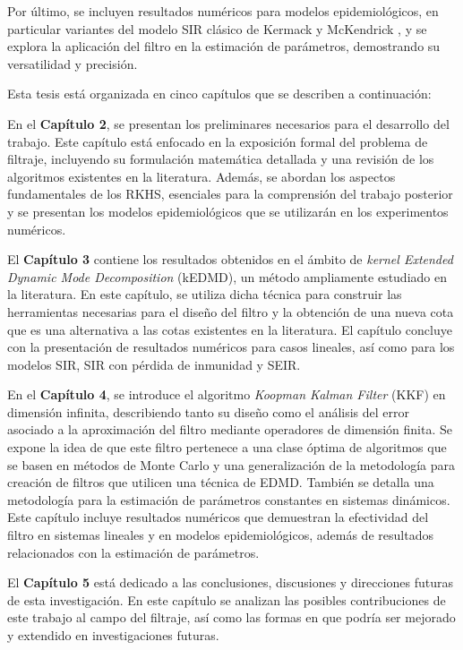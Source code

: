 Por último, se incluyen resultados numéricos para modelos epidemiológicos, en particular variantes del modelo SIR clásico de Kermack y McKendrick \cite{Hethcote1989ThreeModels, Grassly2008MathematicalTransmission}, y se explora la aplicación del filtro en la estimación de parámetros, demostrando su versatilidad y precisión.

Esta tesis está organizada en cinco capítulos que se describen a continuación:

En el \textbf{Capítulo 2}, se presentan los preliminares necesarios para el desarrollo del trabajo. Este capítulo está enfocado en la exposición formal del problema de filtraje, incluyendo su formulación matemática detallada y una revisión de los algoritmos existentes en la literatura. Además, se abordan los aspectos fundamentales de los RKHS, esenciales para la comprensión del trabajo posterior y se presentan los modelos epidemiológicos que se utilizarán en los experimentos numéricos.

El \textbf{Capítulo 3} contiene los resultados obtenidos en el ámbito de \textit{kernel Extended Dynamic Mode Decomposition} (kEDMD), un método ampliamente estudiado en la literatura. En este capítulo, se utiliza dicha técnica para construir las herramientas necesarias para el diseño del filtro y la obtención de una nueva cota que es una alternativa a las cotas existentes en la literatura. El capítulo concluye con la presentación de resultados numéricos para casos lineales, así como para los modelos SIR, SIR con pérdida de inmunidad y SEIR.

En el \textbf{Capítulo 4}, se introduce el algoritmo \textit{Koopman Kalman Filter} (KKF) en dimensión infinita, describiendo tanto su diseño como el análisis del error asociado a la aproximación del filtro mediante operadores de dimensión finita. Se expone la idea de que este filtro pertenece a una clase óptima de algoritmos que se basen en métodos de Monte Carlo y una generalización de la metodología para creación de filtros que utilicen una técnica de EDMD. También se detalla una metodología para la estimación de parámetros constantes en sistemas dinámicos. Este capítulo incluye resultados numéricos que demuestran la efectividad del filtro en sistemas lineales y en modelos epidemiológicos, además de resultados relacionados con la estimación de parámetros.

El \textbf{Capítulo 5} está dedicado a las conclusiones, discusiones y direcciones futuras de esta investigación. En este capítulo se analizan las posibles contribuciones de este trabajo al campo del filtraje, así como las formas en que podría ser mejorado y extendido en investigaciones futuras.

